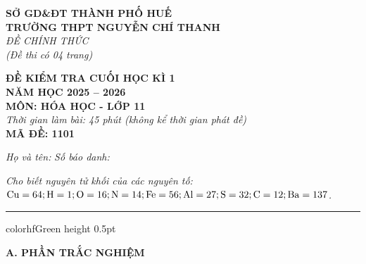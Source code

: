 \documentclass[11pt,a4paper]{article}
\begin{document}
\begin{minipage}[t]{0.48\textwidth}
\textbf{SỞ GD\&ĐT THÀNH PHỐ HUẾ}\\
\textbf{TRƯỜNG THPT NGUYỄN CHÍ THANH}\\
\textit{ĐỀ CHÍNH THỨC}\\
\textit{(Đề thi có 04 trang)}
\end{minipage}
\hfill
\begin{minipage}[t]{0.48\textwidth}
\raggedleft
\textbf{\color{hfRed}ĐỀ KIỂM TRA CUỐI HỌC KÌ 1}\\
\textbf{NĂM HỌC 2025 -- 2026}\\
\textbf{MÔN: HÓA HỌC - LỚP 11}\\
\textit{Thời gian làm bài: 45 phút (không kể thời gian phát đề)}\\
\textbf{MÃ ĐỀ: 1101}
\end{minipage}

\vspace{4pt}
\noindent
\textit{Họ và tên:} \dotfill \textit{Số báo danh:} \dotfill

\vspace{3pt}
\noindent
\textit{\footnotesize Cho biết nguyên tử khối của các nguyên tố: $\ce{Cu} = 64; \ce{H} = 1; \ce{O} = 16; \ce{N} = 14; \ce{Fe} = 56; \ce{Al} = 27; \ce{S} = 32; \ce{C} = 12; \ce{Ba} = 137$.}

\vspace{3pt}
\hrule color{hfGreen} height 0.5pt

\vspace{6pt}
{\large\bfseries\color{mainGreen} A. PHẦN TRẮC NGHIỆM}
\end{document}
